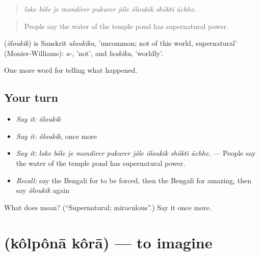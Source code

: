 \begin{quote}
\emph{loke bôle je mondirer pukurer jôle ôloukik shôkti āchhe.}
\end{quote}

\begin{quote}
People say the water of the temple pond has supernatural power.
\end{quote}

\begin{cousinweb}
\textbf{} (\emph{ôloukik}) is Sanskrit \emph{alaukika}, 'uncommon; not of this world, supernatural' (Monier-Williams): \emph{a-}, 'not', and \emph{laukika}, 'worldly'.
\end{cousinweb}

\begin{grammarlens}[title={What you've built}]
One more word for telling what happened.
\end{grammarlens}

\subsection*{Your turn}
\begin{itemize}
\raggedright
  \item \emph{Say it:} \emph{ôloukik}
  \item \emph{Say it:} \emph{ôloukik}, once more
  \item \emph{Say it:} \emph{loke bôle je mondirer pukurer jôle ôloukik shôkti āchhe.} — People say the water of the temple pond has supernatural power.
  \item \emph{Recall:} say the Bengali for to be forced, then the Bengali for amazing, then say \emph{ôloukik} again
\end{itemize}

\begin{tcolorbox}[breakable,colback=teal!4,colframe=teal!35!black,title={Before you move on}]
What does  mean? (\textquotedblleft{}Supernatural; miraculous\textquotedblright{}.) Say it once more.
\end{tcolorbox}
\section[\texorpdfstring{\bn{কল্পনা} \bn{করা} (kôlpônā kôrā)}{কল্পনা করা (kôlpônā kôrā)}]{  (kôlpônā kôrā) — to imagine}

\label{lesson:BN-C326-kolpona-kora}




